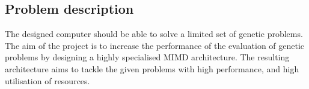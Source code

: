 \subsection{Problem description}
The designed computer should be able to solve a limited set of genetic problems.
The aim of the project is to increase the performance of the evaluation of genetic problems by designing a highly specialised MIMD architecture.
The resulting architecture aims to tackle the given problems with high performance, and high utilisation of resources.

